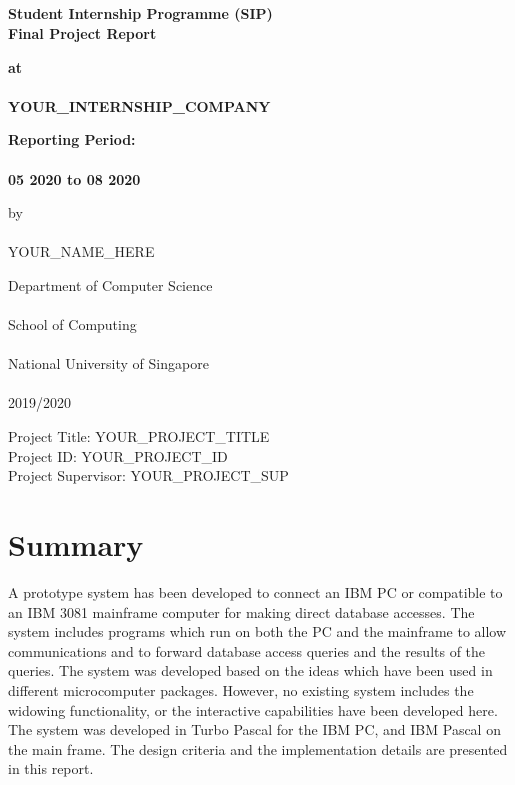 \documentclass[a4paper, 12pt, fleqn]{report}
\begin{document}
\section*{}
\thispagestyle{plain}
\begin{center}
    \vspace*{1cm}

    \Large
    \textbf{Student Internship Programme (SIP) \\
    Final Project Report}

    \vspace{2cm}
    \normalsize
    \textbf{at \\
    \ \\ YOUR\_INTERNSHIP\_COMPANY}
    
    \vspace{1cm}
    \textbf{Reporting Period: \\
    \ \\ 05 2020 to 08 2020}

    \vspace{1cm}
    by \\
    \ \\ YOUR\_NAME\_HERE

    \vfill

    Department of Computer Science \\
    \ \\ School of Computing \\
    \ \\ National University of Singapore \\
    \ \\ 2019/2020
\begin{flushleft}
    Project Title: YOUR\_PROJECT\_TITLE \\
    Project ID: YOUR\_PROJECT\_ID \\
    Project Supervisor: YOUR\_PROJECT\_SUP
\end{flushleft}

\end{center}

\chapter*{Summary}

\noindent A prototype system has been developed to connect an IBM PC or compatible
to an IBM 3081 mainframe computer for making direct database accesses. The system
includes programs which run on both the PC and the mainframe to allow communications
and to forward database access queries and the results of the queries. The system was
developed based on the ideas which have been used in different microcomputer packages.
However, no existing system includes the widowing functionality, or the interactive
capabilities have been developed here. The system was developed in Turbo Pascal
for the IBM PC, and IBM Pascal on the main frame. The design criteria and the
implementation details are presented in this report. \newline
\end{document}
